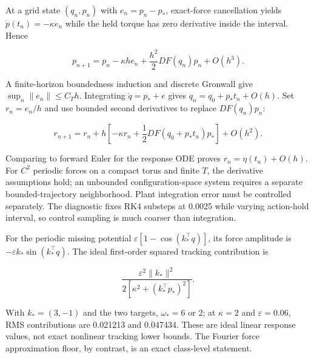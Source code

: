\documentclass[
  10pt,
]{article}
\begin{document}
At a grid state \((q_n,p_n)\) with \(e_n=p_n-p_*\), exact-force
cancellation yields \(\dot p(t_n)=-\kappa e_n\) while the held torque
has zero derivative inside the interval. Hence

\[p_{n+1}=p_n-\kappa h e_n+\frac{h^2}{2}DF(q_n)p_n+O(h^3).\]

A finite-horizon boundedness induction and discrete Gronwall give
\(\sup_n\|e_n\|\le C_T h\). Integrating \(\dot q=p_*+e\) gives
\(q_n=q_0+p_*t_n+O(h)\). Set \(r_n=e_n/h\) and use bounded second
derivatives to replace \(DF(q_n)p_n\):

\[r_{n+1}=r_n+h\left[-\kappa r_n+\frac12DF(q_0+p_*t_n)p_*\right]+O(h^2).\]

Comparing to forward Euler for the response ODE proves
\(r_n=\eta(t_n)+O(h)\). For \(C^2\) periodic forces on a compact torus
and finite \(T\), the derivative assumptions hold; an unbounded
configuration-space system requires a separate bounded-trajectory
neighborhood. Plant integration error must be controlled separately. The
diagnostic fixes RK4 substeps at 0.0025 while varying action-hold
interval, so control sampling is much coarser than integration.

For the periodic missing potential \(\varepsilon[1-\cos(k_*^\top q)]\),
its force amplitude is \(-\varepsilon k_*\sin(k_*^\top q)\). The ideal
first-order squared tracking contribution is

\[\frac{\varepsilon^2\|k_*\|^2}{2[\kappa^2+(k_*^\top p_*)^2]}.\]

With \(k_*=(3,-1)\) and the two targets, \(\omega_*=6\) or 2; at
\(\kappa=2\) and \(\varepsilon=0.06\), RMS contributions are 0.021213
and 0.047434. These are ideal linear response values, not exact
nonlinear tracking lower bounds. The Fourier force approximation floor,
by contrast, is an exact class-level statement.
\end{document}
